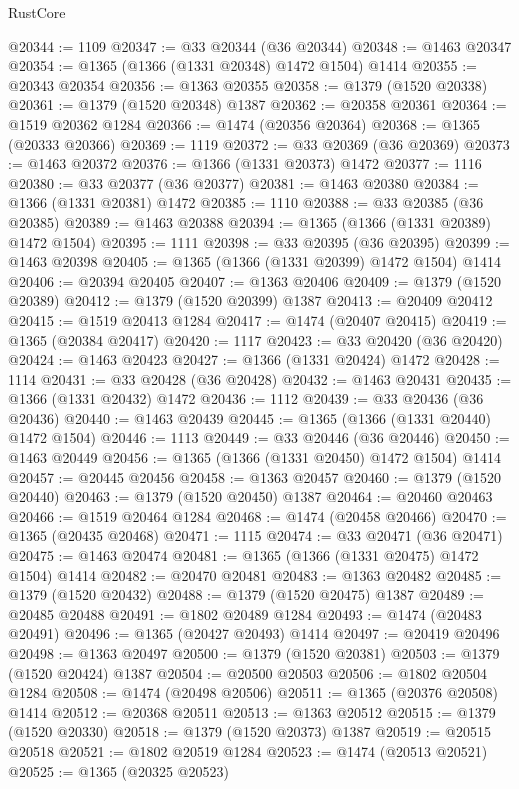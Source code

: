 \begin{lexlean}{RustCore}
\begin{coremodule}
@20344 := 1109
@20347 := @33 @20344 (@36 @20344)
@20348 := @1463 @20347
@20354 := @1365 (@1366 (@1331 @20348) @1472 @1504) @1414
@20355 := @20343 @20354
@20356 := @1363 @20355
@20358 := @1379 (@1520 @20338)
@20361 := @1379 (@1520 @20348) @1387
@20362 := @20358 @20361
@20364 := @1519 @20362 @1284
@20366 := @1474 (@20356 @20364)
@20368 := @1365 (@20333 @20366)
@20369 := 1119
@20372 := @33 @20369 (@36 @20369)
@20373 := @1463 @20372
@20376 := @1366 (@1331 @20373) @1472
@20377 := 1116
@20380 := @33 @20377 (@36 @20377)
@20381 := @1463 @20380
@20384 := @1366 (@1331 @20381) @1472
@20385 := 1110
@20388 := @33 @20385 (@36 @20385)
@20389 := @1463 @20388
@20394 := @1365 (@1366 (@1331 @20389) @1472 @1504)
@20395 := 1111
@20398 := @33 @20395 (@36 @20395)
@20399 := @1463 @20398
@20405 := @1365 (@1366 (@1331 @20399) @1472 @1504) @1414
@20406 := @20394 @20405
@20407 := @1363 @20406
@20409 := @1379 (@1520 @20389)
@20412 := @1379 (@1520 @20399) @1387
@20413 := @20409 @20412
@20415 := @1519 @20413 @1284
@20417 := @1474 (@20407 @20415)
@20419 := @1365 (@20384 @20417)
@20420 := 1117
@20423 := @33 @20420 (@36 @20420)
@20424 := @1463 @20423
@20427 := @1366 (@1331 @20424) @1472
@20428 := 1114
@20431 := @33 @20428 (@36 @20428)
@20432 := @1463 @20431
@20435 := @1366 (@1331 @20432) @1472
@20436 := 1112
@20439 := @33 @20436 (@36 @20436)
@20440 := @1463 @20439
@20445 := @1365 (@1366 (@1331 @20440) @1472 @1504)
@20446 := 1113
@20449 := @33 @20446 (@36 @20446)
@20450 := @1463 @20449
@20456 := @1365 (@1366 (@1331 @20450) @1472 @1504) @1414
@20457 := @20445 @20456
@20458 := @1363 @20457
@20460 := @1379 (@1520 @20440)
@20463 := @1379 (@1520 @20450) @1387
@20464 := @20460 @20463
@20466 := @1519 @20464 @1284
@20468 := @1474 (@20458 @20466)
@20470 := @1365 (@20435 @20468)
@20471 := 1115
@20474 := @33 @20471 (@36 @20471)
@20475 := @1463 @20474
@20481 := @1365 (@1366 (@1331 @20475) @1472 @1504) @1414
@20482 := @20470 @20481
@20483 := @1363 @20482
@20485 := @1379 (@1520 @20432)
@20488 := @1379 (@1520 @20475) @1387
@20489 := @20485 @20488
@20491 := @1802 @20489 @1284
@20493 := @1474 (@20483 @20491)
@20496 := @1365 (@20427 @20493) @1414
@20497 := @20419 @20496
@20498 := @1363 @20497
@20500 := @1379 (@1520 @20381)
@20503 := @1379 (@1520 @20424) @1387
@20504 := @20500 @20503
@20506 := @1802 @20504 @1284
@20508 := @1474 (@20498 @20506)
@20511 := @1365 (@20376 @20508) @1414
@20512 := @20368 @20511
@20513 := @1363 @20512
@20515 := @1379 (@1520 @20330)
@20518 := @1379 (@1520 @20373) @1387
@20519 := @20515 @20518
@20521 := @1802 @20519 @1284
@20523 := @1474 (@20513 @20521)
@20525 := @1365 (@20325 @20523)

\end{coremodule}
\end{lexlean}
